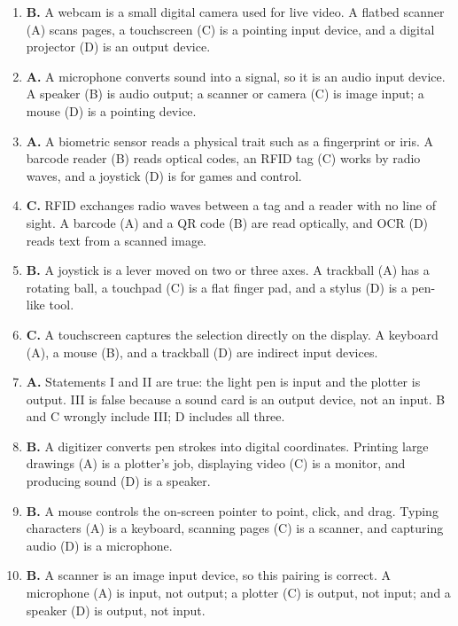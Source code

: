 \documentclass[11pt]{article}
\begin{document}
\begin{enumerate}[label=\textbf{Q\arabic*.}, leftmargin=*]
  image. Turning an image into a printed page (B) is printing, sound into a
  signal (C) is a microphone, and hand movement into coordinates (D) is a
  digitizer.
\item \textbf{B.} A webcam is a small digital camera used for live video. A
  flatbed scanner (A) scans pages, a touchscreen (C) is a pointing input
  device, and a digital projector (D) is an output device.
\item \textbf{A.} A microphone converts sound into a signal, so it is an
  audio input device. A speaker (B) is audio output; a scanner or camera (C)
  is image input; a mouse (D) is a pointing device.
\item \textbf{A.} A biometric sensor reads a physical trait such as a
  fingerprint or iris. A barcode reader (B) reads optical codes, an RFID tag
  (C) works by radio waves, and a joystick (D) is for games and control.
\item \textbf{C.} RFID exchanges radio waves between a tag and a reader with
  no line of sight. A barcode (A) and a QR code (B) are read optically, and
  OCR (D) reads text from a scanned image.
\item \textbf{B.} A joystick is a lever moved on two or three axes. A
  trackball (A) has a rotating ball, a touchpad (C) is a flat finger pad, and
  a stylus (D) is a pen-like tool.
\item \textbf{C.} A touchscreen captures the selection directly on the
  display. A keyboard (A), a mouse (B), and a trackball (D) are indirect
  input devices.
\item \textbf{A.} Statements I and II are true: the light pen is input and
  the plotter is output. III is false because a sound card is an output
  device, not an input. B and C wrongly include III; D includes all three.
\item \textbf{B.} A digitizer converts pen strokes into digital coordinates.
  Printing large drawings (A) is a plotter's job, displaying video (C) is a
  monitor, and producing sound (D) is a speaker.
\item \textbf{B.} A mouse controls the on-screen pointer to point, click, and
  drag. Typing characters (A) is a keyboard, scanning pages (C) is a scanner,
  and capturing audio (D) is a microphone.
\item \textbf{B.} A scanner is an image input device, so this pairing is
  correct. A microphone (A) is input, not output; a plotter (C) is output,
  not input; and a speaker (D) is output, not input.


\end{enumerate}
\end{document}
